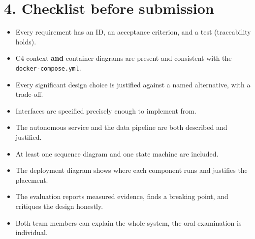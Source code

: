 \documentclass[
  11pt,
]{article}
\providecommand{\tightlist}{%
  \setlength{\itemsep}{0pt}\setlength{\parskip}{0pt}}
\begin{document}
\hypertarget{checklist-before-you-submit}{%
\section{4. Checklist before submission}\label{checklist-before-you-submit}}

\begin{itemize}
\tightlist
\item[$\square$]
  Every requirement has an ID, an acceptance criterion, and a test
  (traceability holds).
\item[$\square$]
  C4 context \textbf{and} container diagrams are present and consistent with the \texttt{docker-compose.yml}.
\item[$\square$]
  Every significant design choice is justified against a named
  alternative, with a trade-off.
\item[$\square$]
  Interfaces are specified precisely enough to implement from.
\item[$\square$]
  The autonomous service and the data pipeline are both described and
  justified.
\item[$\square$]
  At least one sequence diagram and one state machine are included.
\item[$\square$]
  The deployment diagram shows where each component runs and justifies
  the placement.
\item[$\square$]
  The evaluation reports measured evidence, finds a breaking point, and
  critiques the design honestly.
\item[$\square$]
  Both team members can explain the whole system, the oral
  examination is individual.
\end{itemize}
\end{document}
